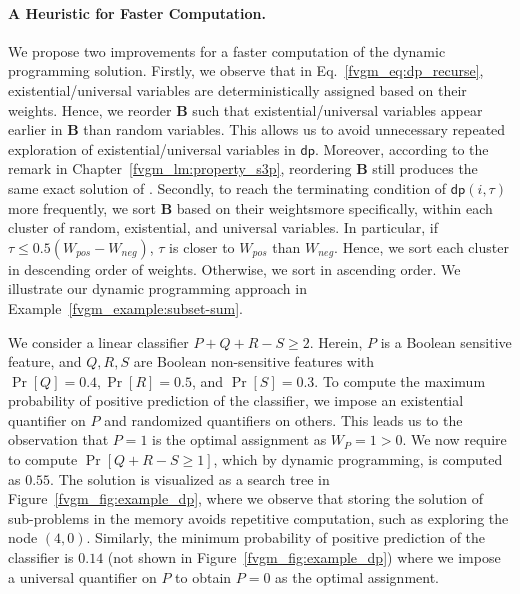 \paragraph{A Heuristic for Faster Computation.} 
We propose two improvements for a faster computation of the dynamic programming solution. Firstly, we observe that in Eq.~\eqref{fvgm_eq:dp_recurse}, existential/universal variables are deterministically  assigned based on their weights. Hence, we reorder $ \mathbf{B} $ such that existential/universal variables appear earlier in $ \mathbf{B} $ than random variables. This allows us to avoid unnecessary repeated exploration of existential/universal variables in $ \mathsf{dp} $. Moreover, according to the remark in Chapter~\ref{fvgm_lm:property_s3p}, reordering $ \mathbf{B} $ still produces the same exact solution of {\stochastic}. Secondly, to reach the terminating condition of $ \mathsf{dp}(i, \tau) $ more frequently, we sort $ \mathbf{B} $ based on their weights\textemdash more specifically, within each cluster of random, existential, and universal variables. In particular, if $ \tau \le 0.5(W_{pos} - W_{neg}) $, $ \tau $ is closer to $ W_{pos} $ than $ W_{neg} $. Hence, we sort each cluster in descending order of weights. Otherwise,  we sort in ascending order. We illustrate our dynamic programming approach in Example~\ref{fvgm_example:subset-sum}.
	
\begin{example}\label{fvgm_example:subset-sum}
\normalfont
We consider a linear classifier $ P + Q + R - S \ge 2$. Herein, $ P $ is a Boolean sensitive feature, and $ Q, R, S $ are Boolean non-sensitive features with $ \Pr[Q] = 0.4,  \Pr[R] = 0.5 $, and $ \Pr[S] = 0.3 $. To compute the maximum probability of positive prediction of the classifier,  we impose an existential quantifier on $P$ and randomized quantifiers on others. This leads us to the observation that $ P = 1 $ is the optimal assignment as $ W_P = 1 > 0 $. We now require to compute $ \Pr[Q + R - S \ge 1] $, which by dynamic programming, is computed as $ 0.55 $. The solution is visualized as a search tree in Figure~\ref{fvgm_fig:example_dp}, where we observe that storing the solution of sub-problems in the memory avoids repetitive computation, such as exploring the node $ (4,0) $. Similarly, the minimum probability of positive prediction  of the classifier is $ 0.14 $ (not shown in Figure~\ref{fvgm_fig:example_dp}) where we impose a universal quantifier on $P$ to obtain $ P = 0 $ as the optimal assignment. 
\end{example}

	
	